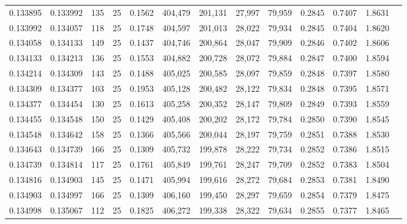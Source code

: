 \begin{tabular}{rrrrrrrrrrrrr}
0.133895 & 0.133992 &   135 &  25 &                                     0.1562 & 404,479 & 201,131 &  27,997 &  79,959 & 0.2845 & 0.7407 & 1.8631 \\
0.133992 & 0.134057 &   118 &  25 &                                     0.1748 & 404,597 & 201,013 &  28,022 &  79,934 & 0.2845 & 0.7404 & 1.8620 \\
0.134058 & 0.134133 &   149 &  25 &                                     0.1437 & 404,746 & 200,864 &  28,047 &  79,909 & 0.2846 & 0.7402 & 1.8606 \\
0.134133 & 0.134213 &   136 &  25 &                                     0.1553 & 404,882 & 200,728 &  28,072 &  79,884 & 0.2847 & 0.7400 & 1.8594 \\
0.134214 & 0.134309 &   143 &  25 &                                     0.1488 & 405,025 & 200,585 &  28,097 &  79,859 & 0.2848 & 0.7397 & 1.8580 \\
0.134309 & 0.134377 &   103 &  25 &                                     0.1953 & 405,128 & 200,482 &  28,122 &  79,834 & 0.2848 & 0.7395 & 1.8571 \\
0.134377 & 0.134454 &   130 &  25 &                                     0.1613 & 405,258 & 200,352 &  28,147 &  79,809 & 0.2849 & 0.7393 & 1.8559 \\
0.134455 & 0.134548 &   150 &  25 &                                     0.1429 & 405,408 & 200,202 &  28,172 &  79,784 & 0.2850 & 0.7390 & 1.8545 \\
0.134548 & 0.134642 &   158 &  25 &                                     0.1366 & 405,566 & 200,044 &  28,197 &  79,759 & 0.2851 & 0.7388 & 1.8530 \\
0.134643 & 0.134739 &   166 &  25 &                                     0.1309 & 405,732 & 199,878 &  28,222 &  79,734 & 0.2852 & 0.7386 & 1.8515 \\
0.134739 & 0.134814 &   117 &  25 &                                     0.1761 & 405,849 & 199,761 &  28,247 &  79,709 & 0.2852 & 0.7383 & 1.8504 \\
0.134816 & 0.134903 &   145 &  25 &                                     0.1471 & 405,994 & 199,616 &  28,272 &  79,684 & 0.2853 & 0.7381 & 1.8490 \\
0.134903 & 0.134997 &   166 &  25 &                                     0.1309 & 406,160 & 199,450 &  28,297 &  79,659 & 0.2854 & 0.7379 & 1.8475 \\
0.134998 & 0.135067 &   112 &  25 &                                     0.1825 & 406,272 & 199,338 &  28,322 &  79,634 & 0.2855 & 0.7377 & 1.8465 \\

\end{tabular}
